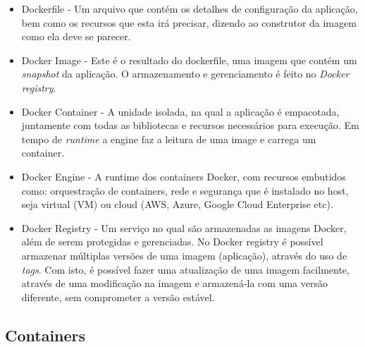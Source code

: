 \documentclass[twoside,english,brazilian]{UNISINOSmonografia}
\begin{document}
\begin{itemize}
	\item Dockerfile - Um arquivo que contém os detalhes de configuração da aplicação, bem como os recursos que esta irá precisar, dizendo ao construtor da imagem como ela deve se parecer.
	\item Docker Image - Este é o resultado do dockerfile, uma imagem que contém um \textit{snapshot} da aplicação. O armazenamento e gerenciamento é feito no \textit{Docker registry}.
	\item Docker Container - A unidade isolada, na qual a aplicação é empacotada, juntamente com todas as bibliotecas e recursos necessários para execução. Em tempo de \textit{runtime} a engine faz a leitura de  uma image e carrega um container.
	\item Docker Engine - A runtime dos containers Docker, com recursos embutidos como: orquestração de containers, rede  e segurança que é instalado no host, seja virtual (VM) ou cloud (AWS, Azure, Google Cloud Enterprise etc).
	\item Docker Registry - Um serviço no qual são armazenadas as imagens Docker, além de serem protegidas e gerenciadas. No Docker registry é possível armazenar múltiplas versões de uma imagem (aplicação), através do uso de \textit{tags}. Com isto, é possível fazer uma atualização de uma imagem facilmente, através de uma modificação na imagem e armazená-la com uma versão diferente, sem comprometer a versão estável.
\end{itemize} 

\subsection{Containers}
\end{document}
